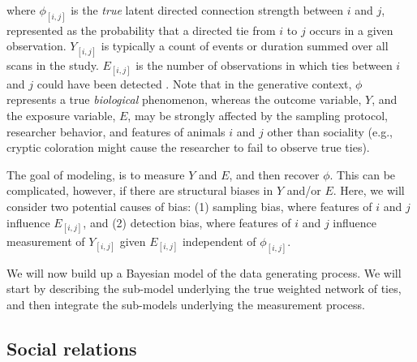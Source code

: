 \documentclass[Afour,sageh,times]{sagej}
\begin{document}
where $\phi_{[i,j]}$ is the \emph{true} latent directed connection strength between $i$ and $j$, represented as the probability that a directed tie from $i$ to $j$ occurs in a given observation. 
$Y_{[i,j]}$ is typically a count of events or duration summed over all scans in the study. 
$E_{[i,j]}$ is the number of observations in which ties between $i$ and $j$ could have been detected \citep[e.g., the total number of scans or the sum of focals for individuals $i$ and $j$.][]{Farine2015a}. Note that in the generative context, $\phi$ represents a true \emph{biological} phenomenon, whereas the outcome variable, $Y$, and the exposure variable, $E$, may be strongly affected by the sampling protocol, researcher behavior, and features of animals $i$ and $j$ other than sociality (e.g., cryptic coloration might cause the researcher to fail to observe true ties). 

The goal of modeling, is to measure $Y$ and $E$, and then recover $\phi$. This can be complicated, however, if there are structural biases in $Y$ and/or $E$. Here, we will consider two potential causes of bias: (1) sampling bias, where features of $i$ and $j$ influence $E_{[i,j]}$, and (2) detection bias, where features of $i$ and $j$ influence measurement of $Y_{[i,j]}$ given $E_{[i,j]}$ independent of $\phi_{[i,j]}$. 

We will now build up a Bayesian model of the data generating process. We will start by describing the sub-model underlying the true weighted network of ties, and then integrate the sub-models underlying the measurement process.

\subsection{Social relations}
\end{document}
